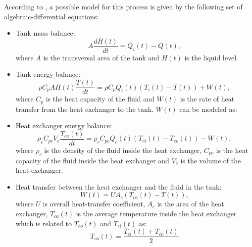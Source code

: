 According to \cite{Alfaro2016}, a possible model for this process is given by the following set of algebraic-differential equations:
\begin{itemize}
	\item Tank mass balance:
			\begin{equation*}
				A \frac{d H(t)}{dt} = Q_i(t) - Q(t),
			\end{equation*}
			where $A$ is the transversal area of the tank and $H(t)$ is the liquid level.
	\item Tank energy balance:
			\begin{equation*}
				\rho C_p A H(t) \frac{T(t)}{dt} = \rho C_p Q_i(t)\left( T_i(t) - T(t)\right) + W(t),
			\end{equation*}
			where $C_p$ is the heat capacity of the fluid and $W(t)$ is the rate of heat transfer from the heat exchanger to the tank. $W(t)$ can be modeled as:
	\item Heat exchanger energy balance:
			\begin{equation*}
				\rho_c C_{pc} V_c \frac{T_{ca}(t)}{dt} = \rho_c C_{pc} Q_c(t)\left( T_{ci}(t)-T_{co}(t)\right) - W(t),
			\end{equation*}
			where $\rho_c$ is the density of the fluid inside the heat exchanger, $C_{pc}$ is the heat capacity of the fluid inside the heat exchanger and $V_c$ is the volume of the heat exchanger.
	\item Heat transfer between the heat exchanger and the fluid in the tank:
			\begin{equation*}
				W(t) = U A_c \left( T_{ca}(t) - T(t)\right), 
			\end{equation*}
			where $U$ is overall heat-transfer coefficient, $A_c$ is the area of the heat exchanger, $T_{ca}(t)$ is the average temperature inside the heat exchanger which is related to $T_{co}(t)$ and $T_{ci}(t)$ as:
			\begin{equation*}
				T_{ca}(t) = \frac{T_{ci}(t) + T_{co}(t)}{2}
			\end{equation*}
\end{itemize}

